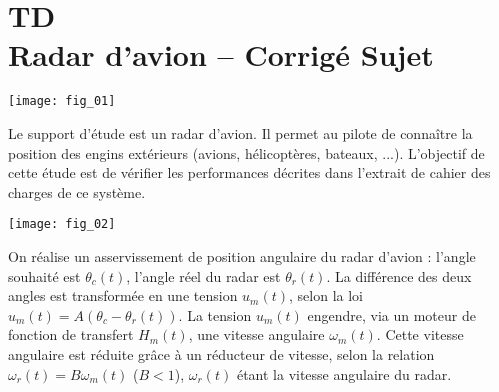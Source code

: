 \chapter*{TD  \\ 
Radar d'avion -- \ifprof Corrigé \else Sujet \fi}


\iflivret {} \else
\ifprof  {} \else \fi
\fi
\setcounter{question}{0}

\begin{marginfigure}
\centering
\texttt{[image: fig\_01]}
\end{marginfigure}




Le support d'étude est un radar d'avion. Il permet au pilote de connaître la position des engins extérieurs (avions, hélicoptères, bateaux, ...). L'objectif de cette étude est de vérifier les performances décrites dans l’extrait de cahier des charges de ce système. 

\begin{marginfigure}
\centering
\texttt{[image: fig\_02]}
\end{marginfigure}

On réalise un asservissement de position angulaire du radar d’avion : l'angle souhaité est $\theta_c (t)$, l'angle réel du radar est $\theta_r (t)$. La différence des deux angles est transformée en une tension $u_m (t)$, selon la loi $u_m (t)= A(\theta_c - \theta_r (t))$. La tension $u_m (t)$ engendre, via un moteur de fonction de transfert $H_m (t)$, une vitesse angulaire $\omega_m (t)$. Cette vitesse angulaire est réduite grâce à un réducteur de vitesse, selon la relation $\omega_r (t) = B \omega_m (t)$ ($B<1$), $\omega_r (t)$ étant la vitesse angulaire du radar. 



